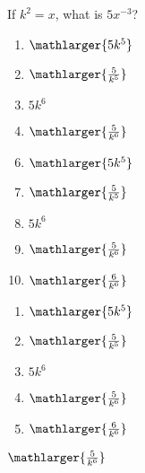 


  If $k^{2}=x$, what is $5x^{-3}$?




\ifsat
	\begin{enumerate}[label=\Alph*)]
		\item   $\mathlarger{5k^{5}}$
		\item  $\mathlarger{\frac{5}{k^{5}}}$
		\item  $5k^{6}$
		\item  $\mathlarger{\frac{5}{k^{6}}}$%
	\end{enumerate}
\else
\fi

\ifacteven
	\begin{enumerate}[label=\textbf{\Alph*.},itemsep=\fill,align=left]
		\setcounter{enumii}{5}
		\item   $\mathlarger{5k^{5}}$
		\item  $\mathlarger{\frac{5}{k^{5}}}$
		\item  $5k^{6}$
		\addtocounter{enumii}{1}
		\item  $\mathlarger{\frac{5}{k^{6}}}$%
		\item   $\mathlarger{\frac{6}{k^{6}}}$
	\end{enumerate}
\else
\fi

\ifactodd
	\begin{enumerate}[label=\textbf{\Alph*.},itemsep=\fill,align=left]
		\item   $\mathlarger{5k^{5}}$
		\item  $\mathlarger{\frac{5}{k^{5}}}$
		\item  $5k^{6}$
		\item  $\mathlarger{\frac{5}{k^{6}}}$%
		\item   $\mathlarger{\frac{6}{k^{6}}}$
	\end{enumerate}
\else
\fi

\ifgridin
  $\mathlarger{\frac{5}{k^{6}}}$%

\else
\fi

